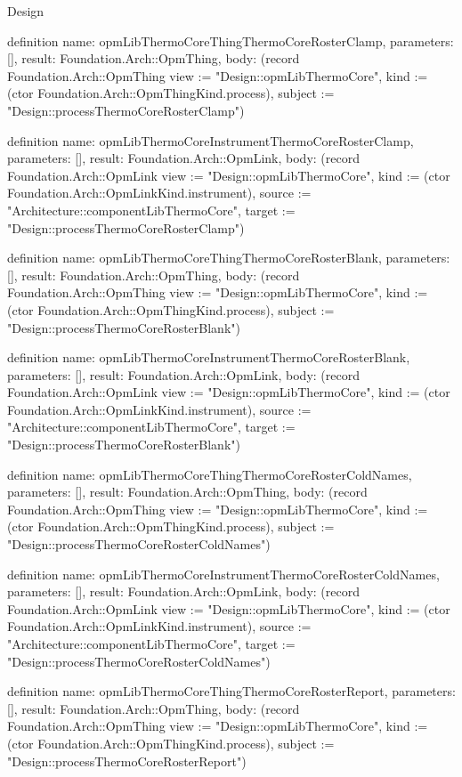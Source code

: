 \begin{lexlean}{Design}
\begin{semanticmodule}
definition{
  name: opmLibThermoCoreThingThermoCoreRosterClamp,
  parameters: [],
  result: Foundation.Arch::OpmThing,
  body: (record Foundation.Arch::OpmThing {view := "Design::opmLibThermoCore", kind := (ctor Foundation.Arch::OpmThingKind.process), subject := "Design::processThermoCoreRosterClamp"})
}

definition{
  name: opmLibThermoCoreInstrumentThermoCoreRosterClamp,
  parameters: [],
  result: Foundation.Arch::OpmLink,
  body: (record Foundation.Arch::OpmLink {view := "Design::opmLibThermoCore", kind := (ctor Foundation.Arch::OpmLinkKind.instrument), source := "Architecture::componentLibThermoCore", target := "Design::processThermoCoreRosterClamp"})
}

definition{
  name: opmLibThermoCoreThingThermoCoreRosterBlank,
  parameters: [],
  result: Foundation.Arch::OpmThing,
  body: (record Foundation.Arch::OpmThing {view := "Design::opmLibThermoCore", kind := (ctor Foundation.Arch::OpmThingKind.process), subject := "Design::processThermoCoreRosterBlank"})
}

definition{
  name: opmLibThermoCoreInstrumentThermoCoreRosterBlank,
  parameters: [],
  result: Foundation.Arch::OpmLink,
  body: (record Foundation.Arch::OpmLink {view := "Design::opmLibThermoCore", kind := (ctor Foundation.Arch::OpmLinkKind.instrument), source := "Architecture::componentLibThermoCore", target := "Design::processThermoCoreRosterBlank"})
}

definition{
  name: opmLibThermoCoreThingThermoCoreRosterColdNames,
  parameters: [],
  result: Foundation.Arch::OpmThing,
  body: (record Foundation.Arch::OpmThing {view := "Design::opmLibThermoCore", kind := (ctor Foundation.Arch::OpmThingKind.process), subject := "Design::processThermoCoreRosterColdNames"})
}

definition{
  name: opmLibThermoCoreInstrumentThermoCoreRosterColdNames,
  parameters: [],
  result: Foundation.Arch::OpmLink,
  body: (record Foundation.Arch::OpmLink {view := "Design::opmLibThermoCore", kind := (ctor Foundation.Arch::OpmLinkKind.instrument), source := "Architecture::componentLibThermoCore", target := "Design::processThermoCoreRosterColdNames"})
}

definition{
  name: opmLibThermoCoreThingThermoCoreRosterReport,
  parameters: [],
  result: Foundation.Arch::OpmThing,
  body: (record Foundation.Arch::OpmThing {view := "Design::opmLibThermoCore", kind := (ctor Foundation.Arch::OpmThingKind.process), subject := "Design::processThermoCoreRosterReport"})
}


\end{semanticmodule}
\end{lexlean}
